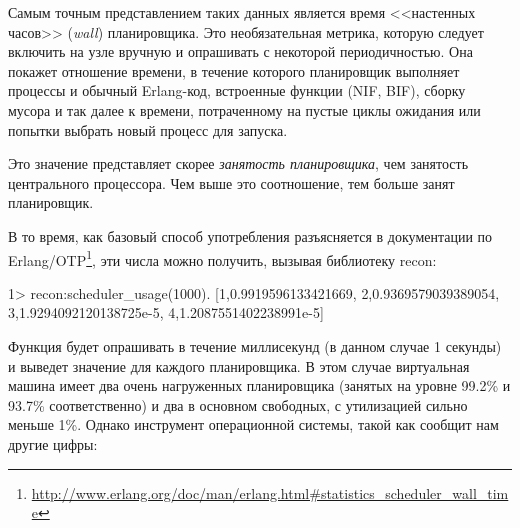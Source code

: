 Самым точным представлением таких данных является время <<настенных часов>> (\emph{wall}) планировщика. Это необязательная метрика, которую следует включить на узле вручную и опрашивать с некоторой периодичностью. Она покажет отношение времени, в течение которого планировщик выполняет процессы и обычный Erlang-код, встроенные функции (NIF, BIF), сборку мусора и так далее к времени, потраченному на пустые циклы ожидания или попытки выбрать новый процесс для запуска.

Это значение представляет скорее \emph{занятость планировщика}, чем занятость центрального процессора. Чем выше это соотношение, тем больше занят планировщик.

В то время, как базовый способ употребления разъясняется в документации по Erlang/OTP\footnote{\href{http://www.erlang.org/doc/man/erlang.html\#statistics\_scheduler\_wall\_time}{http://www.erlang.org/doc/man/erlang.html\#statistics\_scheduler\_wall\_time}}, эти числа можно получить, вызывая библиотеку recon:

\begin{VerbatimEshell}
1> recon:scheduler_usage(1000).
[{1,0.9919596133421669},
 {2,0.9369579039389054},
 {3,1.9294092120138725e-5},
 {4,1.2087551402238991e-5}]
\end{VerbatimEshell}

Функция  будет опрашивать в течение  миллисекунд (в данном случае 1 секунды) и выведет значение для каждого планировщика. В этом случае виртуальная машина имеет два очень нагруженных планировщика (занятых на уровне 99.2\% и 93.7\% соответственно) и два в основном свободных, с утилизацией сильно меньше 1\%. Однако инструмент операционной системы, такой как  сообщит нам другие цифры:

